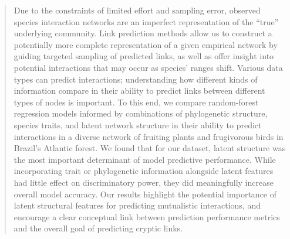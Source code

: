 \documentclass[num-refs]{wiley-article}%
\begin{document}
\begin{frontmatter}
\maketitle


\begin{abstract}
Due to the constraints of limited effort and sampling error, observed species interaction networks are an imperfect representation of the ``true'' underlying community. Link prediction methods allow us to construct a potentially more complete representation of a given empirical network by guiding targeted sampling of predicted links, as well as offer insight into potential interactions that may occur as species' ranges shift. Various data types can predict interactions; understanding how different kinds of information compare in their ability to predict links between different types of nodes is important. To this end, we compare random-forest regression models informed by combinations of phylogenetic structure, species traits, and latent network structure in their ability to predict interactions in a diverse network of fruiting plants and frugivorous birds in Brazil's Atlantic forest. We found that for our dataset, latent structure was the most important determinant of model predictive performance. While incorporating trait or phylogenetic information alongside latent features had little effect on discriminatory power, they did meaningfully increase overall model accuracy. Our results highlight the potential importance of latent structural features for predicting mutualistic interactions, and encourage a clear conceptual link between prediction performance metrics and the overall goal of predicting cryptic links.


\end{abstract}
\end{frontmatter}


\rsbreak








\linenumbers
\end{document}

